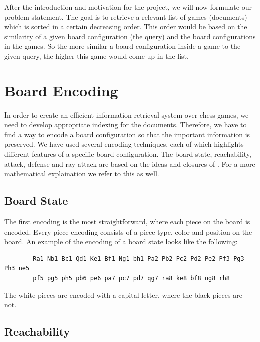 \documentclass[11pt]{article}
\begin{document}
    After the introduction and motivation for the project, we will now formulate our problem statement. The goal is to retrieve a relevant list of games (documents) which is sorted in a certain decreasing order. This order would be based on the similarity of a given board configuration (the query) and the board configurations in the games. So the more similar a board configuration inside a game to the given query, the higher this game would come up in the list.



    \section{Board Encoding}

    In order to create an efficient information retrieval system over chess games, we need to develop appropriate indexing for the documents. Therefore, we have to find a way to encode a board configuration so that the important information is preserved. We have used several encoding techniques, each of which highlights different features of a specific board configuration. The board state, reachability, attack, defense and ray-attack are based on the ideas and closures of \cite{SimilarChessPositions}. For a more mathematical explaination we refer to this as well.

    \subsection{Board State}

    The first encoding is the most straightforward, where each piece on the board is encoded. Every piece encoding consists of a piece type, color and position on the board. An example of the encoding of a board state looks like the following:

    \begin{verbatim}
        Ra1 Nb1 Bc1 Qd1 Ke1 Bf1 Ng1 bh1 Pa2 Pb2 Pc2 Pd2 Pe2 Pf3 Pg3 Ph3 ne5
        pf5 pg5 ph5 pb6 pe6 pa7 pc7 pd7 qg7 ra8 ke8 bf8 ng8 rh8
    \end{verbatim}

    The white pieces are encoded with a capital letter, where the black pieces are not.

    \subsection{Reachability}
\end{document}
